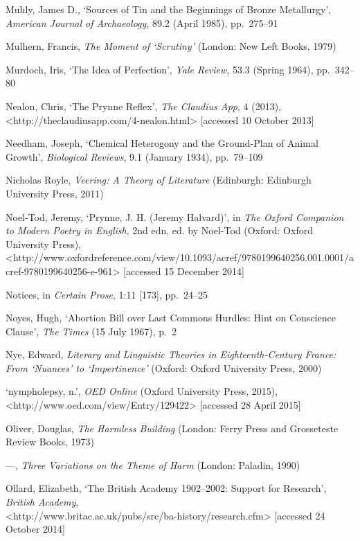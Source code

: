 \documentclass[]{article}
\begin{document}
Muhly, James D., ‘Sources of Tin and the Beginnings of Bronze
Metallurgy’, \emph{American Journal of Archaeology}, 89.2 (April 1985),
pp.~275–91

Mulhern, Francis, \emph{The Moment of ‘Scrutiny’} (London: New Left
Books, 1979)

Murdoch, Iris, ‘The Idea of Perfection’, \emph{Yale Review}, 53.3
(Spring 1964), pp.~342–80

Nealon, Chris, ‘The Prynne Reflex’, \emph{The Claudius App}, 4 (2013),\\
\textless{}http://theclaudiusapp.com/4-nealon.html\textgreater{}
{[}accessed 10 October 2013{]}

Needham, Joseph, ‘Chemical Heterogony and the Ground-Plan of Animal
Growth’, \emph{Biological Reviews}, 9.1 (January 1934), pp.~79–109

Nicholas Royle, \emph{Veering: A Theory of Literature} (Edinburgh:
Edinburgh University Press, 2011)

Noel-Tod, Jeremy, ‘Prynne, J. H. (Jeremy Halvard)’, in \emph{The Oxford
Companion to Modern Poetry in English}, 2nd edn, ed. by Noel-Tod
(Oxford: Oxford University Press),\\
\textless{}http://www.oxfordreference.com/view/10.1093/acref/9780199640256.001.0001/acref-9780199640256-e-961\textgreater{}
{[}accessed 15 December 2014{]}

Notices, in \emph{Certain Prose}, 1:11 {[}173{]}, pp.~24–25

Noyes, Hugh, ‘Abortion Bill over Last Commons Hurdles: Hint on
Conscience Clause’, \emph{The Times} (15 July 1967), p.~2

Nye, Edward, \emph{Literary and Linguistic Theories in
Eighteenth-Century France: From ‘Nuances’ to ‘Impertinence’} (Oxford:
Oxford University Press, 2000)

‘nympholepsy, n.’, \emph{OED Online} (Oxford University Press, 2015),\\
\textless{}http://www.oed.com/view/Entry/129422\textgreater{}
{[}accessed 28 April 2015{]}

Oliver, Douglas, \emph{The Harmless Building} (London: Ferry Press and
Grosseteste Review Books, 1973)

—, \emph{Three Variations on the Theme of Harm} (London: Paladin, 1990)

Ollard, Elizabeth, ‘The British Academy 1902–2002: Support for
Research’, \emph{British Academy},\\
\textless{}http://www.britac.ac.uk/pubs/src/ba-history/research.cfm\textgreater{}
{[}accessed 24 October 2014{]}
\end{document}
